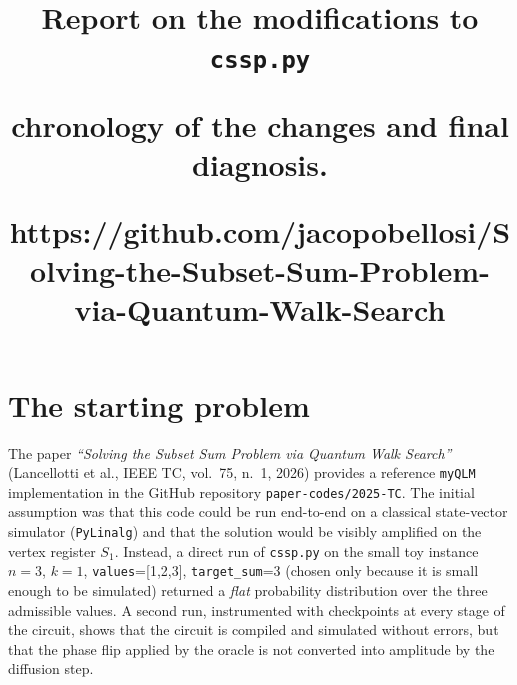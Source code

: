\documentclass[11pt,a4paper]{article}
\title{\textbf{Report on the modifications to \texttt{cssp.py}}%

\large
chronology of the changes and final diagnosis.

https://github.com/jacopobellosi/Solving-the-Subset-Sum-Problem-via-Quantum-Walk-Search
}
\begin{document}
\maketitle

\section{The starting problem}

The paper \emph{``Solving the Subset Sum Problem via Quantum Walk
Search''} (Lancellotti et al., IEEE TC, vol.~75, n.~1, 2026) provides a
reference \texttt{myQLM} implementation in the GitHub repository
\texttt{paper-codes/2025-TC}. The initial assumption was that this
code could be run end-to-end on a classical state-vector simulator
(\texttt{PyLinalg}) and that the solution would be visibly amplified on
the vertex register $S_1$. Instead, a direct run of \texttt{cssp.py} on
the small toy instance $n{=}3$, $k{=}1$, \texttt{values}=[1,2,3],
\texttt{target\_sum}=3 (chosen only because it is small enough to be
simulated) returned a \emph{flat} probability distribution
over the three admissible values. A second run, instrumented with
checkpoints at every stage of the circuit, shows that the circuit is
compiled and simulated without errors, but that the phase flip applied
by the oracle is not converted into amplitude by the diffusion step.
\end{document}
